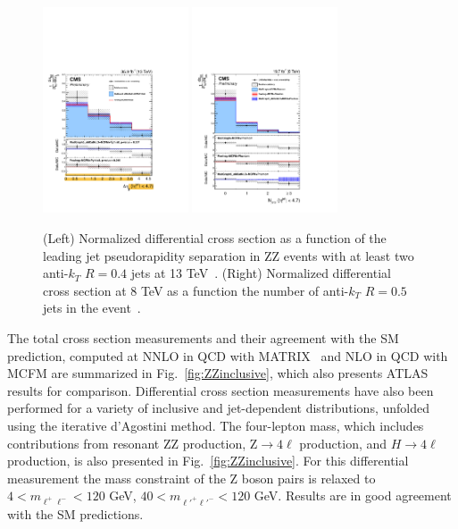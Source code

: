 \documentclass[10pt]{article}
\begin{document}
\begin{figure}[htb]
  \centering
    \includegraphics[height=2.4in]{figures/ZZ_13TeV_dEtajj_unfolded.pdf}
    \includegraphics[height=2.4in]{figures/ZZ_8TeV_nJets_unfolded.pdf}
  \caption{(Left) Normalized differential cross section as a function of the
          leading jet pseudorapidity separation in ZZ events with at least
          two anti-$k_{T}$ $R=0.4$ jets at 13 TeV~\cite{CMS-PAS-SMP-16-019}. 
          (Right) Normalized differential cross section at 8 TeV
          as a function the number of anti-$k_{T}$ $R=0.5$ jets in the 
          event~\cite{CMS-PAS-SMP-15-012}.}
  \label{fig:ZZjets}
\end{figure}
The total cross section measurements and their agreement with the SM
prediction, computed at NNLO in QCD with \textsc{MATRIX}~\cite{Cascioli:2014yka}\cite{Grazzini:2015hta} 
and NLO in QCD with \textsc{MCFM}
are summarized in Fig.~\ref{fig:ZZinclusive}, which also presents ATLAS results for comparison. 
Differential cross section measurements have also been performed for a variety of inclusive 
and jet-dependent distributions, unfolded using the iterative d'Agostini method. 
The four-lepton mass, which includes contributions 
from resonant ZZ production, Z$\rightarrow 4\ell$ production, and $H \rightarrow 4\ell$ production,
is also presented in Fig.~\ref{fig:ZZinclusive}.
For this differential measurement the mass constraint of the Z boson pairs is relaxed to
$4 < m_{\ell^{+}\ell^{-}} < 120$ GeV, $40 < m_{\ell'^{+}\ell'^{-}} < 120$ GeV. 
Results are in good agreement with the SM predictions.
\end{document}
